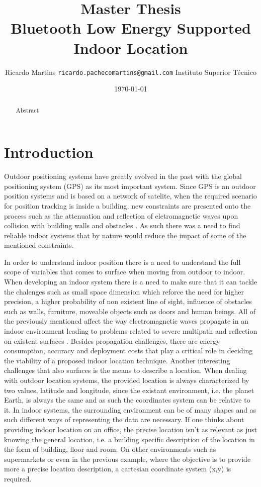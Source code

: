 \documentclass[a4paper]{IEEEtran}
\title{{ \normalsize Master Thesis} \\
	Bluetooth Low Energy Supported Indoor Location}
\author{
	Ricardo Martins {\tt ricardo.pachecomartins@gmail.com}
	Instituto Superior T\'{e}cnico}
\date{\today}
\begin{document}
\maketitle

\begin{abstract}

	Abstract

\end{abstract}

\section{Introduction}
\label{sec:Introduction}

Outdoor positioning systems have greatly evolved in the past with the global positioning system (GPS) as its most important system. Since GPS is an outdoor position systems and is based on a network of satelite, when the required scenario for position tracking is inside a building, new constraints are presented onto the process such as the attenuation and reflection of eletromagnetic waves upon collision with building walls and obstacles \cite{survey1}. As such there was a need to find reliable indoor systems that by nature would reduce the impact of some of the mentioned constraints.

In order to understand indoor position there is a need to understand the full scope of variables that comes to surface when moving from outdoor to indoor. When developing an indoor system there is a need to make sure that it can tackle the chalenges such as small space dimension which reforce the need for higher precision, a higher probability of non existent line of sight, influence of obstacles such as walls, furniture, moveable objects such as doors and human beings\cite{reviewtechniques, survey3}. All of the previously mentioned affect the way electromagnetic waves propagate in an indoor environment leading to problems related to severe multipath and reflection on existent surfaces \cite{surveywireless}. Besides propagation challenges, there are energy consumption, accuracy and deployment costs that play a critical role in deciding the viability of a proposed indoor location technique. Another interesting challenges that also surfaces is the means to describe a location. When dealing with outdoor location systems, the provided location is always characterized by two values, latitude and longitude, since the existant environment, i.e. the planet Earth, is always the same and as such the coordinates system can be relative to it. In indoor systems, the surrounding environment can be of many shapes and as such different ways of representing the data are necessary. If one thinks about providing indoor location on an office, the precise location isn't as relevant as just knowing the general location, i.e. a building specific description of the location in the form of building, floor and room. On other environments such as supermarkets or even in the previous example, where the objective is to provide more a precise location description, a cartesian coordinate system (x,y) is required.
\end{document}
